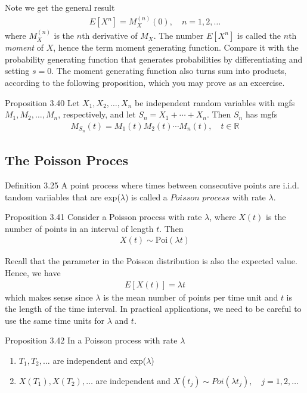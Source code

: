 Note we get the general result
\begin{align*}
  E[X^n] = M^{(n)}_X(0), \quad n = 1, 2, \ldots
\end{align*}
where $M_X^{(n)}$ is the $n$th derivative of $M_X$.
The number $E[X^n]$ is called the $n$th \textit{moment} of $X$, hence the term moment generating function. Compare it with the probability generating function that generates probabilities by differentiating and setting $s = 0$. The moment generating function also turns sum into products, according to the following proposition, which you may prove as an excercise.
\begin{boks}{Proposition 3.40}
  Let $X_1, X_2, \ldots, X_n$ be independent random variables with mgfs $M_1, M_2, \ldots, M_n$, respectively, and let $S_n = X_1 + \cdots + X_n$. Then $S_n$ has mgfs
  \begin{align*}
    M_{S_n}(t) = M_1(t)M_2(t)\cdots M_n(t), \quad t \in \mathbb{R}
  \end{align*}
\end{boks}

\subsection{The Poisson Proces}
\begin{boks}{Definition 3.25}
  A point process where times between consecutive points are i.i.d. tandom variiables that are exp($\lambda$) is called a $Poisson$ $process$ with rate $\lambda$.
\end{boks}

\begin{boks}{Proposition 3.41}
  Consider a Poisson process with rate $\lambda$, where $X(t)$ is the number of points in an interval of length $t$.
  Then
  \begin{align*}
    X(t) \sim \text{Poi}(\lambda t)
  \end{align*}
\end{boks}
Recall that the parameter in the Poisson distribution is also the expected value.
Hence, we have
\begin{align*}
  E[X(t)] = \lambda t
\end{align*}
which makes sense since $\lambda$ is the mean number of points per time unit and $t$ is the length of the time interval.
In practical applications, we need to be careful to use the same time units for $\lambda$ and $t$.
\begin{boks}{Proposition 3.42}
  In a Poisson process with rate $\lambda$
  \begin{enumerate}
    \item $T_1, T_2, \ldots$ are independent and exp($\lambda$)
    \item $X(T_1), X(T_2), \ldots$ are independent and $X(t_j) \sim Poi(\lambda t_j), \quad j = 1, 2, \ldots$
  \end{enumerate}
\end{boks}

